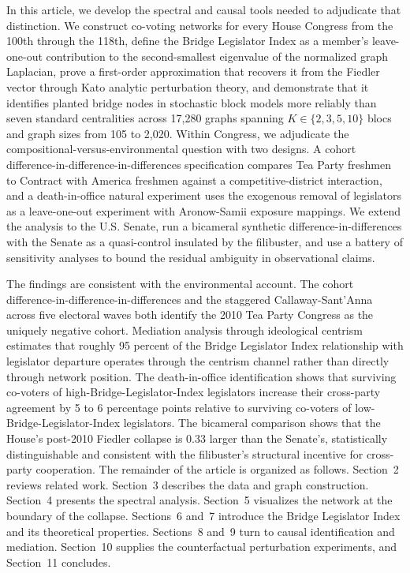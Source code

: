 \documentclass[12pt, a4paper]{article}
\begin{document}
In this article, we develop the spectral and causal tools needed to adjudicate that distinction. We construct co-voting networks for every House Congress from the 100th through the 118th, define the Bridge Legislator Index as a member's leave-one-out contribution to the second-smallest eigenvalue of the normalized graph Laplacian, prove a first-order approximation that recovers it from the Fiedler vector through Kato analytic perturbation theory, and demonstrate that it identifies planted bridge nodes in stochastic block models more reliably than seven standard centralities across 17,280 graphs spanning $K \in \{2, 3, 5, 10\}$ blocs and graph sizes from 105 to 2,020. Within Congress, we adjudicate the compositional-versus-environmental question with two designs. A cohort difference-in-difference-in-differences specification compares Tea Party freshmen to Contract with America freshmen against a competitive-district interaction, and a death-in-office natural experiment uses the exogenous removal of legislators as a leave-one-out experiment with Aronow-Samii exposure mappings. We extend the analysis to the U.S. Senate, run a bicameral synthetic difference-in-differences with the Senate as a quasi-control insulated by the filibuster, and use a battery of sensitivity analyses to bound the residual ambiguity in observational claims.

The findings are consistent with the environmental account. The cohort difference-in-difference-in-differences and the staggered Callaway-Sant'Anna across five electoral waves both identify the 2010 Tea Party Congress as the uniquely negative cohort. Mediation analysis through ideological centrism estimates that roughly 95 percent of the Bridge Legislator Index relationship with legislator departure operates through the centrism channel rather than directly through network position. The death-in-office identification shows that surviving co-voters of high-Bridge-Legislator-Index legislators increase their cross-party agreement by 5 to 6 percentage points relative to surviving co-voters of low-Bridge-Legislator-Index legislators. The bicameral comparison shows that the House's post-2010 Fiedler collapse is 0.33 larger than the Senate's, statistically distinguishable and consistent with the filibuster's structural incentive for cross-party cooperation. The remainder of the article is organized as follows. Section~2 reviews related work. Section~3 describes the data and graph construction. Section~4 presents the spectral analysis. Section~5 visualizes the network at the boundary of the collapse. Sections~6 and~7 introduce the Bridge Legislator Index and its theoretical properties. Sections~8 and~9 turn to causal identification and mediation. Section~10 supplies the counterfactual perturbation experiments, and Section~11 concludes.
\end{document}
